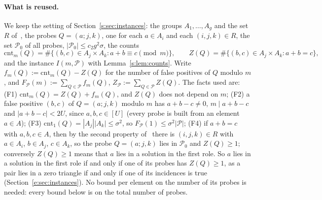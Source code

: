 \documentclass[11pt]{article}
\theoremstyle{definition}
\theoremstyle{remark}
\newcommand{\cnt}{\mathrm{cnt}}
\newcommand{\Pq}{\mathcal{P}}
\begin{document}
\paragraph{What is reused.} We keep the setting of Section~\ref{s:sec:instances}: the groups $A_1,\dots,A_g$ and the set $R$ of~\cite[Lemma~3.3]{FKP24}, the probes $Q=(a;j,k)$, one for each $a\in A_i$ and each $(i,j,k)\in R$, the set $\Pq_0$ of all probes, $|\Pq_0|\le c_2g^2\sigma$, the counts
\[
\cnt_m(Q)=\#\{(b,c)\in A_j\times A_k:a+b\equiv c\pmod m\},\qquad Z(Q)=\#\{(b,c)\in A_j\times A_k:a+b=c\},
\]
and the instance $I(m,\Pq)$ with Lemma~\ref{s:lem:counts}. Write $f_m(Q):=\cnt_m(Q)-Z(Q)$ for the number of false positives of $Q$ modulo $m$, and $F_{\Pq}(m):=\sum_{Q\in\Pq}f_m(Q)$, $Z_{\Pq}:=\sum_{Q\in\Pq}Z(Q)$. The facts used are: (F1) $\cnt_m(Q)=Z(Q)+f_m(Q)$, and $Z(Q)$ does not depend on $m$; (F2) a false positive $(b,c)$ of $Q=(a;j,k)$ modulo $m$ has $a+b-c\ne0$, $m\mid a+b-c$ and $|a+b-c|<2U$, since $a,b,c\in[U]$ (every probe is built from an element $a\in A$); (F3) $\cnt_1(Q)=|A_j||A_k|\le\sigma^2$, so $F_{\Pq}(1)\le\sigma^2|\Pq|$; (F4) if $a+b=c$ with $a,b,c\in A$, then by the second property of~\cite[Lemma~3.3]{FKP24} there is $(i,j,k)\in R$ with $a\in A_i$, $b\in A_j$, $c\in A_k$, so the probe $Q=(a;j,k)$ lies in $\Pq_0$ and $Z(Q)\ge1$; conversely $Z(Q)\ge1$ means that $a$ lies in a solution in the first role. So $a$ lies in a solution in the first role if and only if one of its probes has $Z(Q)\ge1$, as a pair lies in a zero triangle if and only if one of its incidences is true (Section~\ref{e:sec:instances}). No bound per element on the number of its probes is needed: every bound below is on the total number of probes.
\end{document}
